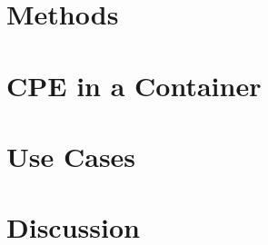 \documentclass[conference]{IEEEtran}
\begin{document}
\section{Methods}
\label{sec:methods}


\section{CPE in a Container}
\label{sec:cpe}


\section{Use Cases}
\label{sec:usecases}


\section{Discussion}
\label{sec:discussion}




\end{document}
